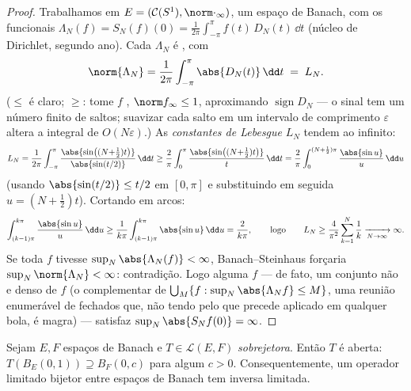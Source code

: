 \begin{proof}
Trabalhamos em $E = (\mathcal C(S^1), \norm\cdot_\infty)$, um espaço de Banach, com os funcionais $\Lambda_N(f) = S_N(f)(0) =
\frac1{2\pi}\int_{-\pi}^{\pi}f(t)\,D_N(t)\,\dd t$
(núcleo de Dirichlet, segundo ano). Cada $\Lambda_N$ é , com
\[
\norm{\Lambda_N} = \frac1{2\pi}\int_{-\pi}^\pi\abs{D_N(t)}\,\dd
t \;=\; L_N .
\]
($\leq$ é claro; $\geq$: tome $f$ , $\norm f_\infty
\leq 1$,
aproximando $\operatorname{sign}D_N$ --- o sinal tem um número finito de saltos; suavizar
cada salto em um intervalo de comprimento $\varepsilon$ altera a integral de
$O(N\varepsilon)$.) As \emph{constantes de Lebesgue} $L_N$ tendem ao infinito:
\[
L_N = \frac1{2\pi}\int_{-\pi}^{\pi}
\frac{\abs{\sin\bigl((N{+}\tfrac12)t\bigr)}}{\abs{\sin(t/2)}}
\,\dd t
\geq \frac{2}{\pi}\int_0^{\pi}
\frac{\abs{\sin\bigl((N{+}\tfrac12)t\bigr)}}{t}\,\dd t
= \frac{2}{\pi}\int_0^{(N+\frac12)\pi}\frac{\abs{\sin
u}}{u}\,\dd u
\]
(usando $\abs{\sin(t/2)} \leq t/2$ em $[0, \pi]$ e substituindo em seguida $u = (N + \tfrac12)t$). Cortando em
arcos:
\[
\int_{(k-1)\pi}^{k\pi}\frac{\abs{\sin u}}u\,\dd u
\geq \frac1{k\pi}\int_{(k-1)\pi}^{k\pi}\abs{\sin u}\,\dd u =
\frac{2}{k\pi},
\qquad\text{logo}\qquad
L_N \geq \frac{4}{\pi^2}\sum_{k=1}^N\frac1k
\xrightarrow[N\to\infty]{} \infty .
\]
Se toda $f$  tivesse $\sup_N
\abs{\Lambda_N(f)} < \infty$, Banach--Steinhaus forçaria
$\sup_N\norm{\Lambda_N} < \infty$: contradição. Logo alguma $f$ --- de fato, um conjunto não
 e denso de $f$ (o complementar de $\bigcup_M\{f: \sup_N\abs{\Lambda_Nf}\leq M\}$, uma reunião
enumerável de fechados que, não tendo  pelo que precede
aplicado em qualquer bola, é magra) --- satisfaz $\sup_N\abs{S_Nf(0)} =
\infty$.
\end{proof}

\begin{theorem}\label{thm:b3:banach:openmapping}
Sejam $E, F$ espaços de Banach e $T \in \mathcal L(E, F)$ \emph{sobrejetora}. Então
$T$ é aberta: $T(B_E(0,1)) \supseteq
B_F(0, c)$ para algum $c > 0$. Consequentemente, um
operador limitado bijetor entre espaços de Banach tem inversa
limitada.
\end{theorem}

